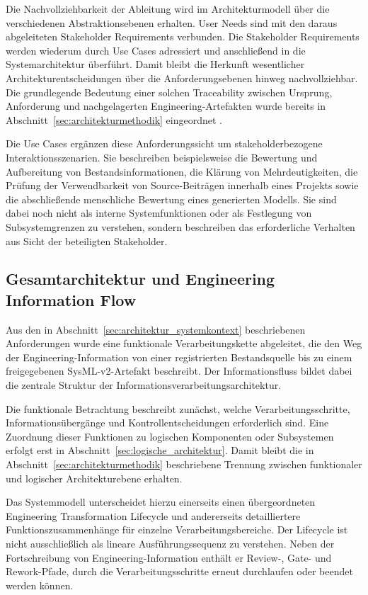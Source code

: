 Die Nachvollziehbarkeit der Ableitung wird im Architekturmodell über die
verschiedenen Abstraktionsebenen erhalten. User Needs sind mit den daraus
abgeleiteten Stakeholder Requirements verbunden. Die Stakeholder Requirements
werden wiederum durch Use Cases adressiert und anschließend in die
Systemarchitektur überführt. Damit bleibt die Herkunft wesentlicher
Architekturentscheidungen über die Anforderungsebenen hinweg nachvollziehbar.
Die grundlegende Bedeutung einer solchen Traceability zwischen Ursprung,
Anforderung und nachgelagerten Engineering-Artefakten wurde bereits in
Abschnitt~\ref{sec:architekturmethodik} eingeordnet \cite{ISO29148}.

Die Use Cases ergänzen diese Anforderungssicht um stakeholderbezogene
Interaktionsszenarien. Sie beschreiben beispielsweise die Bewertung und
Aufbereitung von Bestandsinformationen, die Klärung von Mehrdeutigkeiten, die
Prüfung der Verwendbarkeit von Source-Beiträgen innerhalb eines Projekts sowie
die abschließende menschliche Bewertung eines generierten Modells. Sie sind
dabei noch nicht als interne Systemfunktionen oder als Festlegung von
Subsystemgrenzen zu verstehen, sondern beschreiben das erforderliche Verhalten
aus Sicht der beteiligten Stakeholder.

\subsection{Gesamtarchitektur und Engineering Information Flow}
\label{sec:engineering_information_flow}

Aus den in Abschnitt~\ref{sec:architektur_systemkontext} beschriebenen
Anforderungen wurde eine funktionale Verarbeitungskette abgeleitet, die den Weg
der Engineering-Information von einer registrierten Bestandsquelle bis zu einem
freigegebenen SysML-v2-Artefakt beschreibt. Der Informationsfluss bildet dabei
die zentrale Struktur der Informationsverarbeitungsarchitektur.

Die funktionale Betrachtung beschreibt zunächst, welche Verarbeitungsschritte,
Informationsübergänge und Kontrollentscheidungen erforderlich sind. Eine
Zuordnung dieser Funktionen zu logischen Komponenten oder Subsystemen erfolgt
erst in Abschnitt~\ref{sec:logische_architektur}. Damit bleibt die in
Abschnitt~\ref{sec:architekturmethodik} beschriebene Trennung zwischen
funktionaler und logischer Architekturebene erhalten.

Das Systemmodell unterscheidet hierzu einerseits einen übergeordneten
Engineering Transformation Lifecycle und andererseits detailliertere
Funktionszusammenhänge für einzelne Verarbeitungsbereiche. Der Lifecycle ist
nicht ausschließlich als lineare Ausführungssequenz zu verstehen. Neben der
Fortschreibung von Engineering-Information enthält er Review-, Gate- und
Rework-Pfade, durch die Verarbeitungsschritte erneut durchlaufen oder beendet
werden können.


